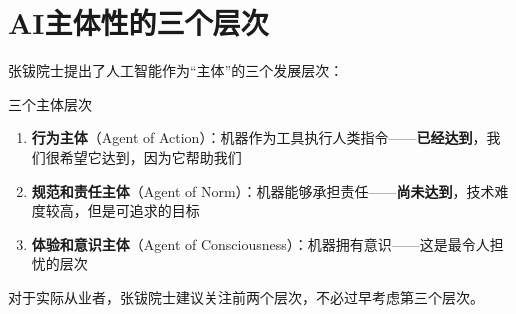 \section{AI主体性的三个层次}

张钹院士提出了人工智能作为``主体''的三个发展层次：

\begin{importantbox}{三个主体层次}
\begin{enumerate}
\item \textbf{行为主体}（Agent of Action）：机器作为工具执行人类指令——\textbf{已经达到}，我们很希望它达到，因为它帮助我们
\item \textbf{规范和责任主体}（Agent of Norm）：机器能够承担责任——\textbf{尚未达到}，技术难度较高，但是可追求的目标
\item \textbf{体验和意识主体}（Agent of Consciousness）：机器拥有意识——这是最令人担忧的层次
\end{enumerate}
\end{importantbox}

对于实际从业者，张钹院士建议关注前两个层次，不必过早考虑第三个层次。


